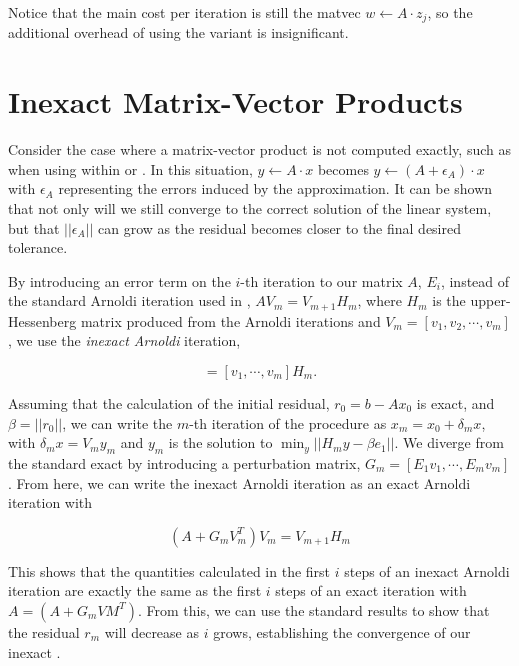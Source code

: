 Notice that the main cost per iteration is still the matvec $w \gets A\cdot z_{j}$, so the additional overhead of using the {\fgmres} variant is insignificant.

\section{Inexact Matrix-Vector Products}\label{subsec:inexact_matvec}

Consider the case where a matrix-vector product is not computed exactly, such as when using {\fmm} within {\gmres} or {\fgmres}. In this situation, $y \gets A\cdot x$ becomes $y \gets (A+\epsilon_{A})\cdot x$ with $\epsilon_A$ representing the errors induced by the {\fmm} approximation. It can be shown \cite{simonciniszyld2003} that not only will we still converge to the correct solution of the linear system, but that $||\epsilon_{A}||$ can grow as the residual becomes closer to the final desired tolerance. 

By introducing an error term on the $i$-th iteration to our matrix $A$, $E_i$, instead of the standard Arnoldi iteration used in {\gmres}, $AV_m = V_{m+1}H_{m}$, where $H_m$ is the upper-Hessenberg matrix produced from the Arnoldi iterations and $V_m = [v_1, v_2, \cdots, v_m]$, we use the \emph{inexact Arnoldi} iteration,

\begin{equation}
	[(A+E_1)v_1, \cdots, (A+E_m)v_m] = [v_1, \cdots, v_m]H_m.
\end{equation}

Assuming that the calculation of the initial residual, $r_0 = b-Ax_0$ is exact, and $\beta = ||r_0||$, we can write the $m$-th iteration of the {\gmres} procedure as $x_m = x_0 + \delta_mx$, with $\delta_mx = V_my_m$ and $y_m$ is the solution to $\min_y||H_my-\beta e_1||$. We diverge from the standard exact {\gmres} by introducing a perturbation matrix, $G_m = [E_1v_1, \cdots, E_mv_m]$. From here, we can write the inexact Arnoldi iteration as an exact Arnoldi iteration with

\begin{equation}
	(A+G_m V_m^{T})V_m = V_{m+1}H_m
\end{equation}

This shows that the quantities calculated in the first $i$ steps of an inexact Arnoldi iteration are exactly the same as the first $i$ steps of an exact iteration with $A = (A+G_mVM^{T})$. From this, we can use the standard {\gmres} results to show that the residual $r_m$ will decrease as $i$ grows, establishing the convergence of our inexact {\gmres}.

